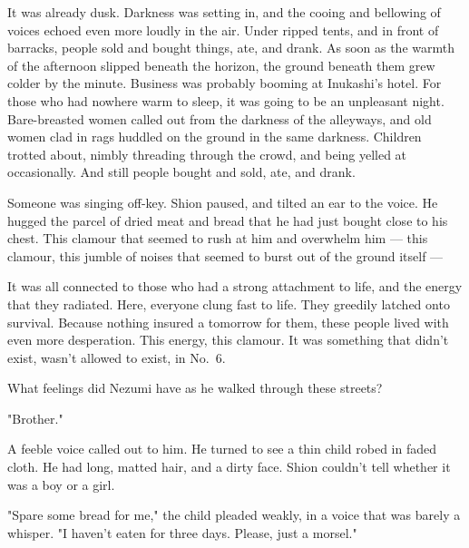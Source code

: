 It was already dusk. Darkness was setting in, and the cooing and
bellowing of voices echoed even more loudly in the air. Under ripped
tents, and in front of barracks, people sold and bought things, ate, and
drank. As soon as the warmth of the afternoon slipped beneath the
horizon, the ground beneath them grew colder by the minute. Business was
probably booming at Inukashi's hotel. For those who had nowhere warm to
sleep, it was going to be an unpleasant night. Bare-breasted women
called out from the darkness of the alleyways, and old women clad in
rags huddled on the ground in the same darkness. Children trotted about,
nimbly threading through the crowd, and being yelled at occasionally.
And still people bought and sold, ate, and drank.


Someone was singing off-key. Shion paused, and tilted an ear to the
voice. He hugged the parcel of dried meat and bread that he had just
bought close to his chest. This clamour that seemed to rush at him and
overwhelm him --- this clamour, this jumble of noises that seemed to burst
out of the ground itself ---

It was all connected to those who had a strong attachment to life, and
the energy that they radiated. Here, everyone clung fast to life. They
greedily latched onto survival. Because nothing insured a tomorrow for
them, these people lived with even more desperation. This energy, this
clamour. It was something that didn't exist, wasn't allowed to exist, in
No.~6.

What feelings did Nezumi have as he walked through these streets?

"Brother."

A feeble voice called out to him. He turned to see a thin child robed in
faded cloth. He had long, matted hair, and a dirty face. Shion couldn't
tell whether it was a boy or a girl.

"Spare some bread for me," the child pleaded weakly, in a voice that was
barely a whisper. "I haven't eaten for three days. Please, just a
morsel."

